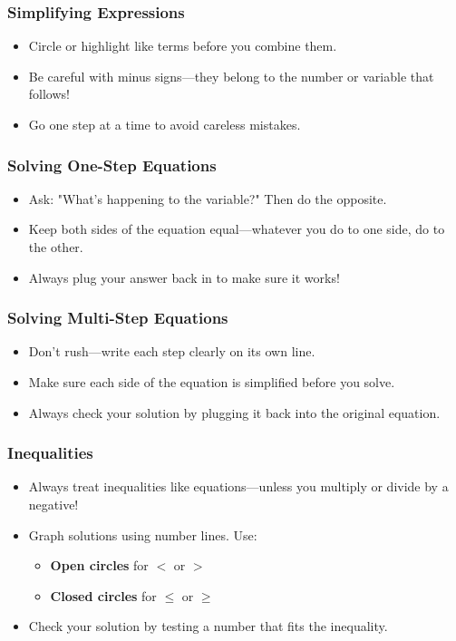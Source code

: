 \subsubsection*{Simplifying Expressions}
\begin{itemize}
  \item Circle or highlight like terms before you combine them.
  \item Be careful with minus signs—they belong to the number or variable that follows!
  \item Go one step at a time to avoid careless mistakes.
\end{itemize}

\subsubsection*{Solving One-Step Equations}
\begin{itemize}
  \item Ask: "What's happening to the variable?" Then do the opposite.
  \item Keep both sides of the equation equal—whatever you do to one side, do to the other.
  \item Always plug your answer back in to make sure it works!
\end{itemize}

\subsubsection*{Solving Multi-Step Equations}
\begin{itemize}
  \item Don't rush—write each step clearly on its own line.
  \item Make sure each side of the equation is simplified before you solve.
  \item Always check your solution by plugging it back into the original equation.
\end{itemize}

\subsubsection*{Inequalities}
\begin{itemize}
  \item Always treat inequalities like equations—unless you multiply or divide by a negative!
  \item Graph solutions using number lines. Use:
    \begin{itemize}
      \item \textbf{Open circles} for $<$ or $>$
      \item \textbf{Closed circles} for $\leq$ or $\geq$
    \end{itemize}
  \item Check your solution by testing a number that fits the inequality.
\end{itemize}